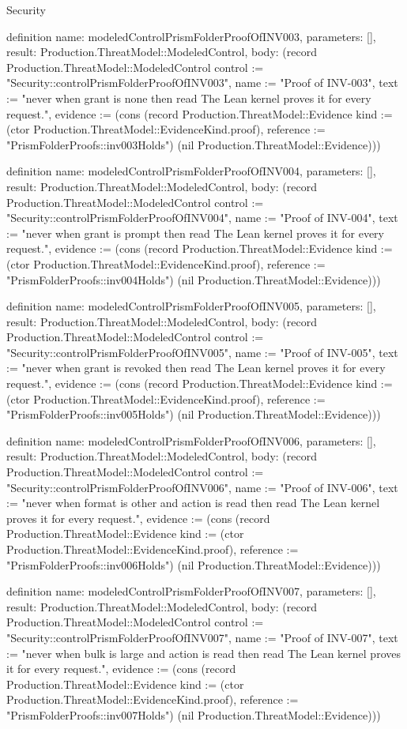 \begin{lexlean}{Security}
\begin{semanticmodule}
definition{
  name: modeledControlPrismFolderProofOfINV003,
  parameters: [],
  result: Production.ThreatModel::ModeledControl,
  body: (record Production.ThreatModel::ModeledControl {control := "Security::controlPrismFolderProofOfINV003", name := "Proof of INV-003", text := "never when grant is none then read The Lean kernel proves it for every request.", evidence := (cons (record Production.ThreatModel::Evidence {kind := (ctor Production.ThreatModel::EvidenceKind.proof), reference := "PrismFolderProofs::inv003Holds"}) (nil Production.ThreatModel::Evidence))})
}

definition{
  name: modeledControlPrismFolderProofOfINV004,
  parameters: [],
  result: Production.ThreatModel::ModeledControl,
  body: (record Production.ThreatModel::ModeledControl {control := "Security::controlPrismFolderProofOfINV004", name := "Proof of INV-004", text := "never when grant is prompt then read The Lean kernel proves it for every request.", evidence := (cons (record Production.ThreatModel::Evidence {kind := (ctor Production.ThreatModel::EvidenceKind.proof), reference := "PrismFolderProofs::inv004Holds"}) (nil Production.ThreatModel::Evidence))})
}

definition{
  name: modeledControlPrismFolderProofOfINV005,
  parameters: [],
  result: Production.ThreatModel::ModeledControl,
  body: (record Production.ThreatModel::ModeledControl {control := "Security::controlPrismFolderProofOfINV005", name := "Proof of INV-005", text := "never when grant is revoked then read The Lean kernel proves it for every request.", evidence := (cons (record Production.ThreatModel::Evidence {kind := (ctor Production.ThreatModel::EvidenceKind.proof), reference := "PrismFolderProofs::inv005Holds"}) (nil Production.ThreatModel::Evidence))})
}

definition{
  name: modeledControlPrismFolderProofOfINV006,
  parameters: [],
  result: Production.ThreatModel::ModeledControl,
  body: (record Production.ThreatModel::ModeledControl {control := "Security::controlPrismFolderProofOfINV006", name := "Proof of INV-006", text := "never when format is other and action is read then read The Lean kernel proves it for every request.", evidence := (cons (record Production.ThreatModel::Evidence {kind := (ctor Production.ThreatModel::EvidenceKind.proof), reference := "PrismFolderProofs::inv006Holds"}) (nil Production.ThreatModel::Evidence))})
}

definition{
  name: modeledControlPrismFolderProofOfINV007,
  parameters: [],
  result: Production.ThreatModel::ModeledControl,
  body: (record Production.ThreatModel::ModeledControl {control := "Security::controlPrismFolderProofOfINV007", name := "Proof of INV-007", text := "never when bulk is large and action is read then read The Lean kernel proves it for every request.", evidence := (cons (record Production.ThreatModel::Evidence {kind := (ctor Production.ThreatModel::EvidenceKind.proof), reference := "PrismFolderProofs::inv007Holds"}) (nil Production.ThreatModel::Evidence))})
}


\end{semanticmodule}
\end{lexlean}
